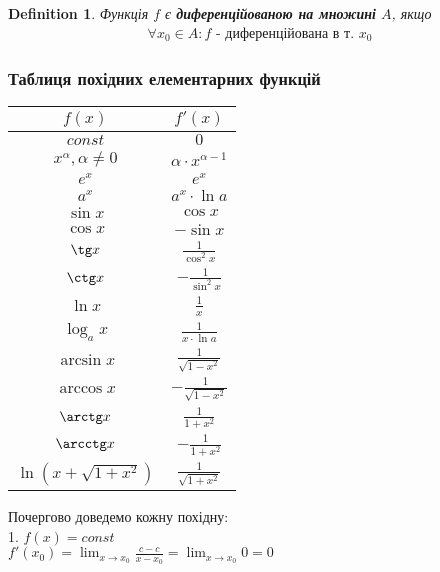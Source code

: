 \documentclass[a4paper, 14pt]{article}
\theoremstyle{theoremdd}
\theoremstyle{theoremdd}
\newtheorem{definition}[theorem]{Definition}
\theoremstyle{theoremdd}
\theoremstyle{theoremdd}
\theoremstyle{theoremdd}
\theoremstyle{theoremdd}
\theoremstyle{theoremdd}
\theoremstyle{theoremdd}
\begin{document}
\begin{definition}
Функція $f$ є \textbf{диференційованою на множині} $A$, якщо
\begin{align*}
\forall x_0 \in A: f \text{ - диференційована в т. } x_0
\end{align*}
\end{definition}

\subsubsection*{Таблиця похідних елементарних функцій}
\begin{center}
\begin{tabular}{ c|c }
 $f(x)$ & $f'(x)$ \\
 \hline 
 $const$ & $0$ \\ [2ex]
 \hline 
 $x^\alpha, \alpha \neq 0$ & $\alpha \cdot x^{\alpha-1}$ \\ [2ex]
 \hline 
 $e^x$ & $e^x$ \\ [2ex]
 \hline 
 $a^x$ & $a^x \cdot \ln a$ \\ [2ex]
 \hline 
 $\sin x$ & $\cos x$\\ [2ex]
 \hline 
 $\cos x$ & $-\sin x$\\ [2ex]
 \hline 
 $\tg x$ & $\displaystyle \frac{1}{\cos^2 x}$\\ [2ex]
 \hline 
 $\ctg x$ & $-\displaystyle \frac{1}{\sin^2 x}$\\ [2ex]
 \hline 
 $\ln x$ & $\displaystyle \frac{1}{x}$\\ [2ex]
 \hline 
 $\log_a x$ & $\displaystyle \frac{1}{x \cdot \ln a}$\\ [2ex]
 \hline 
 $\arcsin x$ & $\displaystyle \frac{1}{\sqrt{1-x^2}}$\\ [2ex]
 \hline 
 $\arccos x$ & $\displaystyle -\frac{1}{\sqrt{1-x^2}}$\\ [2ex]
 \hline 
 $\arctg x$ & $\displaystyle \frac{1}{1+x^2}$\\ [2ex]
 \hline 
 $\arcctg x$ & $\displaystyle -\frac{1}{1+x^2}$\\ [2ex]
 \hline 
 $\ln(x+\sqrt{1+x^2})$ & $\displaystyle \frac{1}{\sqrt{1+x^2}}$\\ [2ex]
 \hline 
\end{tabular}
\end{center}

Почергово доведемо кожну похідну:\\
1. $f(x) = const$\\
$f'(x_0) = \displaystyle \lim_{x \to x_0} \frac{c-c}{x-x_0} = \lim_{x \to x_0} 0 = 0$
\bigskip \\
\end{document}
